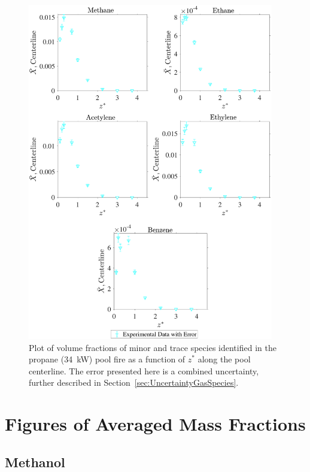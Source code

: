 \documentclass[12pt]{article}
\begin{document}
\begin{figure}[!h]
	\centering
\includegraphics[width=10.75cm,keepaspectratio]{Propane 34KW_Inter_MOL_FRAC_Plot.pdf}
	\caption[Volume fractions of minor and trace species in the propane (34~kW) plume]{Plot of volume fractions of minor and trace species identified in the propane (34~kW) pool fire as a function of $z^{*}$ along the pool centerline. The error presented here is a combined uncertainty, further described in Section~\ref{sec:UncertaintyGasSpecies}.}
	\label{fig:Propane20kW_VOL_Frac_Inter}
\end{figure}
\clearpage

\section{Figures of Averaged Mass Fractions}\label{sec:Mix_Frac_Figs}

\subsection{Methanol}
\label{ssec:Methanol_ALL_Mix_Frac}
\end{document}

